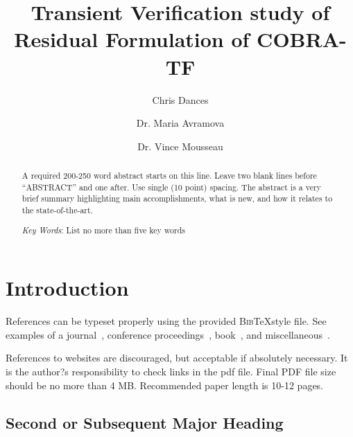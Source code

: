 \documentclass{mc2015}
\begin{document}
\title{Transient Verification study of Residual Formulation of COBRA-TF }

\author{Chris Dances}
\author{Dr. Maria Avramova}

\author{Dr. Vince Mousseau}

\maketitle

\begin{abstract}
A required 200-250 word abstract starts on this line.  Leave two blank lines before ``ABSTRACT'' and one after.  
Use single (10 point) spacing.  
The abstract is a very brief summary highlighting main accomplishments, what is new, and how it relates to the state-of-the-art.

\emph{Key Words}: List no more than five key words
\end{abstract}

\section{Introduction}

References can be typeset properly using the provided \textsc{Bib}\TeX style
file. See examples of a journal~\cite{journal}, conference
proceedings~\cite{proceedings}, book~\cite{book}, and
miscellaneous~\cite{misc}.

References to websites are discouraged, but acceptable if absolutely necessary.  It is the author?s responsibility to check links in the pdf file.
Final PDF file size should be no more than 4 MB.  Recommended paper length is 10-12 pages.

\subsection{Second or Subsequent Major Heading}
\end{document}
